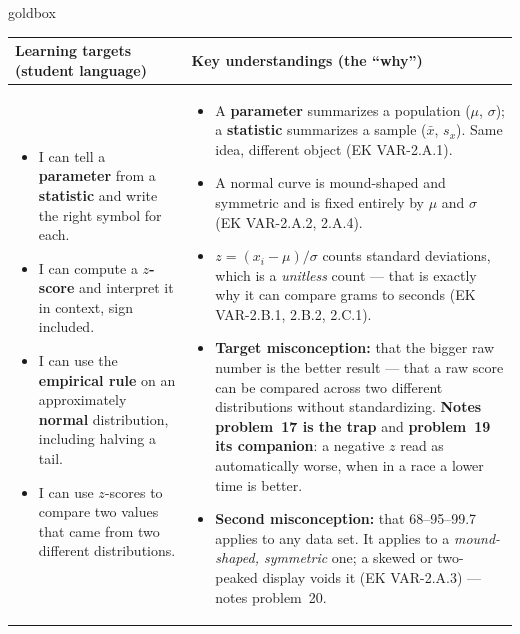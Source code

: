 \documentclass[10pt]{article}
\begin{document}
\renewcommand{\arraystretch}{1.4}
\boxguard
\begin{skillbox}{goldbox}
\begin{tabularx}{\linewidth}{@{}X|X@{}}
\textbf{Learning targets (student language)} & \textbf{Key understandings (the ``why'')} \\[2pt]
\hline
\vspace{-6pt}
\begin{itemize}[leftmargin=1.1em, nosep, after=\vspace{2pt}]
  \item I can tell a \textbf{parameter} from a \textbf{statistic} and write the right symbol for
        each.
  \item I can compute a \textbf{$z$-score} and interpret it in context, sign included.
  \item I can use the \textbf{empirical rule} on an approximately \textbf{normal} distribution,
        including halving a tail.
  \item I can use $z$-scores to compare two values that came from two different distributions.
\end{itemize}
&
\vspace{-6pt}
\begin{itemize}[leftmargin=1.1em, nosep, after=\vspace{2pt}]
  \item A \textbf{parameter} summarizes a population ($\mu$, $\sigma$); a \textbf{statistic}
        summarizes a sample ($\bar x$, $s_x$). Same idea, different object (EK VAR-2.A.1).
  \item A normal curve is mound-shaped and symmetric and is fixed entirely by $\mu$ and $\sigma$
        (EK VAR-2.A.2, 2.A.4).
  \item $z = (x_i - \mu)/\sigma$ counts standard deviations, which is a \emph{unitless} count ---
        that is exactly why it can compare grams to seconds (EK VAR-2.B.1, 2.B.2, 2.C.1).
  \item \textbf{Target misconception:} that the bigger raw number is the better result --- that a
        raw score can be compared across two different distributions without standardizing.
        \textbf{Notes problem~17 is the trap} and \textbf{problem~19 its companion}: a negative
        $z$ read as automatically worse, when in a race a lower time is better.
  \item \textbf{Second misconception:} that 68--95--99.7 applies to any data set. It applies to a
        \emph{mound-shaped, symmetric} one; a skewed or two-peaked display voids it
        (EK VAR-2.A.3) --- notes problem~20.
\end{itemize}
\end{tabularx}
\end{skillbox}
\end{document}
